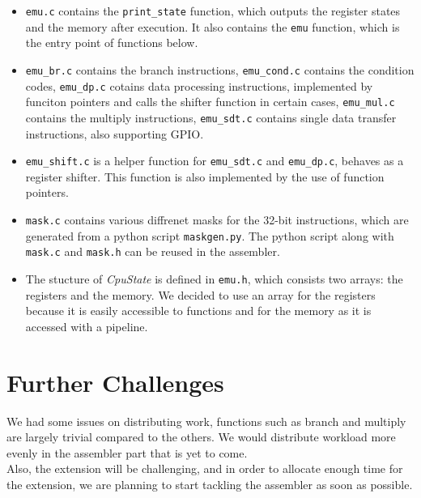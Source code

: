 \documentclass[11pt]{article}
\begin{document}
\begin{itemize}
\item \texttt{emu.c} contains the \texttt{print\_state} function, which outputs the register states and the memory after execution. It also contains the \texttt{emu} function, which is the entry point of functions below.
\item \texttt{emu\_br.c} contains the branch instructions, \texttt{emu\_cond.c} contains the condition codes, 
\texttt{emu\_dp.c} cotains data processing instructions, implemented by funciton pointers and calls the shifter function in certain cases, \texttt{emu\_mul.c} contains the multiply instructions, 
\texttt{emu\_sdt.c} contains single data transfer instructions, also supporting GPIO.
\item \texttt{emu\_shift.c} is a helper function for \texttt{emu\_sdt.c} and \texttt{emu\_dp.c}, behaves as a register shifter. This function is also implemented by the use of function pointers.
\item \texttt{mask.c} contains various diffrenet masks for the 32-bit instructions, which are generated from a python script \texttt{maskgen.py}. The python script along with \texttt{mask.c} and \texttt{mask.h} can be reused in the assembler.
\item The stucture of \textit{CpuState} is defined in \texttt{emu.h}, which consists two arrays: the registers and the memory. We decided to use an array for the registers because it is easily accessible to functions and for the memory as it is accessed with a pipeline.
\end{itemize}

\section{Further Challenges}
We had some issues on distributing work, functions such as branch and multiply are largely trivial compared to the others. We would distribute workload more evenly in the assembler part that is yet to come. \\

Also, the extension will be challenging, and in order to allocate enough time for the extension, we are planning to start tackling the assembler as soon as possible. 
\end{document}

